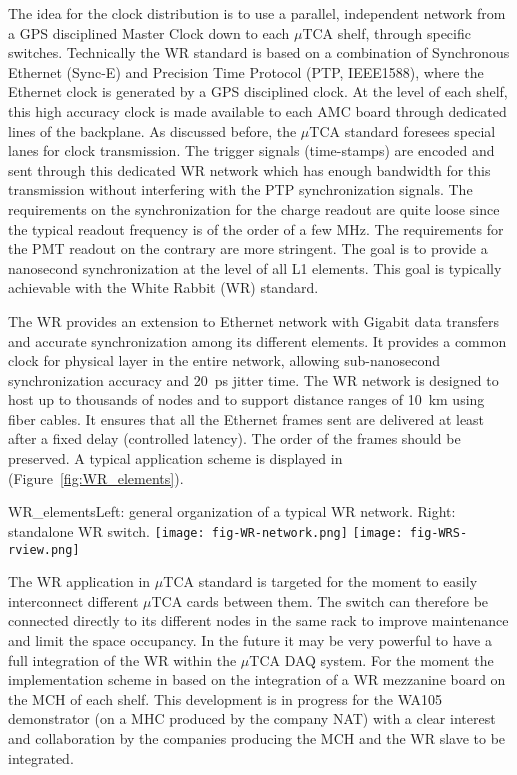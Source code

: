 The idea for the clock distribution is to use a parallel, independent
network from a GPS disciplined Master Clock down to each $\mu$TCA
shelf, through specific switches. Technically the WR standard is based
on a combination of Synchronous Ethernet (Sync-E) and Precision Time
Protocol (PTP, IEEE1588), where the Ethernet clock is generated by a
GPS disciplined clock. At the level of each shelf, this high accuracy
clock is made available to each AMC board through dedicated lines of
the backplane. As discussed before, the $\mu$TCA standard foresees
special lanes for clock transmission. The trigger signals
(time-stamps) are encoded and sent through this dedicated WR network
which has enough bandwidth for this transmission without interfering
with the PTP synchronization signals. The requirements on the
synchronization for the charge readout are quite loose since the
typical readout frequency is of the order of a few MHz. The
requirements for the PMT readout on the contrary are more
stringent. The goal is to provide a nanosecond synchronization at the
level of all L1 elements. This goal is typically achievable with the
White Rabbit (WR) standard\cite{WR-standard}.

The WR provides an extension to Ethernet network with Gigabit data
transfers and accurate synchronization among its different
elements. It provides a common clock for physical layer in the entire
network, allowing sub-nanosecond synchronization accuracy and 20~ps
jitter time. The WR network is designed to host up to thousands of
nodes and to support distance ranges of 10~km using fiber cables. It
ensures that all the Ethernet frames sent are delivered at least after
a fixed delay (controlled latency). The order of the frames should be
preserved.  A typical application scheme is displayed in
(Figure~\ref{fig:WR_elements}).
\begin{cdrfigure}{WR_elements}{\small Left: general organization of a typical WR network. Right: standalone WR switch.}
\texttt{[image: fig-WR-network.png]}
\texttt{[image: fig-WRS-rview.png]}
\end{cdrfigure}

The WR application in $\mu$TCA standard is targeted for the moment to
easily interconnect different $\mu$TCA cards between them. The switch
can therefore be connected directly to its different nodes in the same
rack to improve maintenance and limit the space occupancy. In the
future it may be very powerful to have a full integration of the WR
within the $\mu$TCA DAQ system. For the moment the implementation
scheme in based on the integration of a WR mezzanine board on the MCH
of each shelf. This development is in progress for the WA105
demonstrator (on a MHC produced by the company NAT) with a clear
interest and collaboration by the companies producing the MCH and the
WR slave to be integrated.
